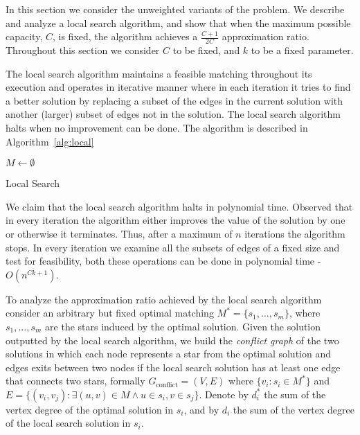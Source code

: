 In this section we consider the unweighted variants of the problem.
We describe and analyze a local search algorithm, 
and show that when the maximum possible capacity, $C$, is fixed, the algorithm achieves 
a $\frac{C + 1}{2C}$ approximation ratio.
Throughout this section we consider $C$ to be fixed, and $k$ to be a fixed parameter.  

The local search algorithm maintains a feasible matching throughout its execution
and operates in 
iterative manner where in each iteration it tries to find a better solution by
replacing a subset of the edges in the current solution with 
another (larger) subset of edges not in the solution.
The local search algorithm halts when no improvement can be done.
The algorithm is described in Algorithm~\ref{alg:local} 

\begin{algorithm}
$M \leftarrow \emptyset$								\\

\caption{
\label{alg:local}
Local Search}
\end{algorithm}


We claim that the local search algorithm halts in polynomial time.
Observed that in every iteration the algorithm either improves the value of the solution
by one or otherwise it terminates. 
Thus, after a maximum of $n$ iterations the algorithm stops.
In every iteration we examine all the subsets of edges of a fixed size and test for feasibility,
both these operations can be done in polynomial time - $O(n^{Ck + 1})$. 

To analyze the approximation ratio achieved by the local search algorithm consider an 
arbitrary but fixed optimal matching $M^* = \{s_1, \ldots, s_m\}$,
where $s_1, \ldots, s_m$ are the stars induced by the optimal solution.
Given the solution outputted by the local search algorithm,
we build the \emph{conflict graph} of the two solutions in which each node
represents a star from the optimal solution and edges exits between two nodes if
the local search solution has at least one edge that connects two stars, formally 
$G_\text{conflict} = (V, E)$ 
where $\{v_i : s_i \in M^* \}$ 
and $E = \{(v_i, v_j) : \exists (u,v) \in M \land u \in s_i, v \in s_j \}$.
Denote by $d^*_i$ the sum of the vertex degree of the optimal solution in $s_i$, 
and by $d_i$ the sum of the vertex degree of the local search solution in $s_i$.

